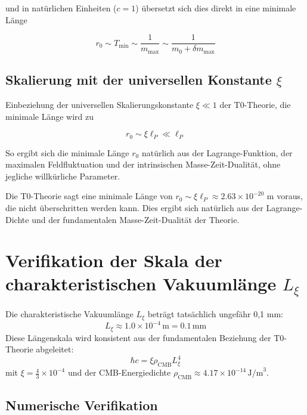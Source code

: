\documentclass[12pt,a4paper]{article}
\numberwithin{equation}{section}
\begin{document}
	und in natürlichen Einheiten ($c = 1$) übersetzt sich dies direkt in eine minimale Länge
	
	\begin{equation}
		r_0 \sim T_{\mathrm{min}} \sim \frac{1}{m_{\mathrm{max}}} \sim \frac{1}{m_0 + \delta m_{\mathrm{max}}}
	\end{equation}
	
	\subsection{Skalierung mit der universellen Konstante $\xi$}
	
	Einbeziehung der universellen Skalierungskonstante $\xi \ll 1$ der T0-Theorie, die minimale Länge wird zu
	
	\begin{equation}
		r_0 \sim \xi \ell_P \ll \ell_P
	\end{equation}
	
	So ergibt sich die minimale Länge $r_0$ natürlich aus der Lagrange-Funktion, der maximalen Feldfluktuation und der intrinsischen Masse-Zeit-Dualität, ohne jegliche willkürliche Parameter.
	\begin{revolutionary}
		Die T0-Theorie sagt eine minimale Länge von $r_0 \sim \xi \ell_P \approx 2.63 \times 10^{-20}$ m voraus, die nicht überschritten werden kann. Dies ergibt sich natürlich aus der Lagrange-Dichte und der fundamentalen Masse-Zeit-Dualität der Theorie.
	\end{revolutionary}
	\section*{Verifikation der Skala der charakteristischen Vakuumlänge $L_\xi$}
	
	\begin{important}
		Die charakteristische Vakuumlänge $L_\xi$ beträgt tatsächlich ungefähr 0,1 mm:
		\[
		L_\xi \approx 1.0 \times 10^{-4}\,\text{m} = 0.1\,\text{mm}
		\]
		Diese Längenskala wird konsistent aus der fundamentalen Beziehung der T0-Theorie abgeleitet:
		\[
		\hbar c = \xi \rho_{\text{CMB}} L_\xi^4
		\]
		mit $\xi = \frac{4}{3} \times 10^{-4}$ und der CMB-Energiedichte $\rho_{\text{CMB}} \approx 4.17 \times 10^{-14}\,\text{J/m}^3$.
	\end{important}
	
	\subsection*{Numerische Verifikation}
	
\end{document}
